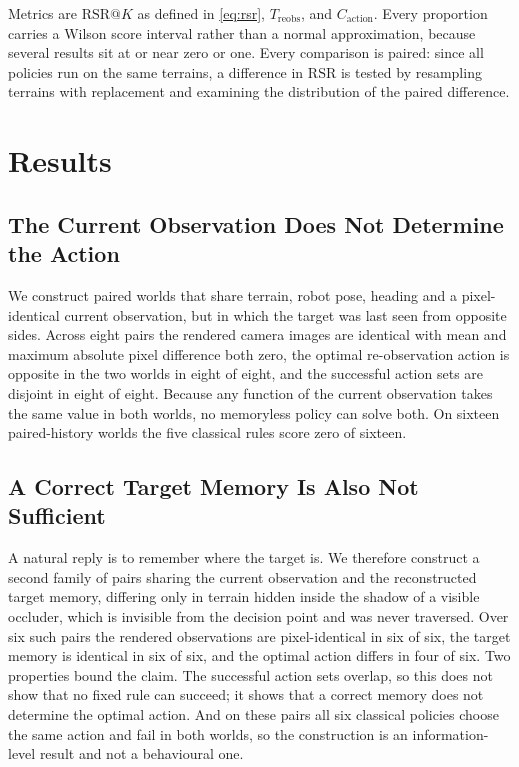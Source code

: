\documentclass[conference]{IEEEtran}
\begin{document}
Metrics are $\mathrm{RSR}@K$ as defined in \eqref{eq:rsr}, $T_{\mathrm{reobs}}$, and
$C_{\mathrm{action}}$. Every proportion carries a Wilson score interval rather than a
normal approximation, because several results sit at or near zero or one. Every
comparison is paired: since all policies run on the same terrains, a difference in
$\mathrm{RSR}$ is tested by resampling terrains with replacement and examining the
distribution of the paired difference.

\section{Results}

\subsection{The Current Observation Does Not Determine the Action}

We construct paired worlds that share terrain, robot pose, heading and a
pixel-identical current observation, but in which the target was last seen from
opposite sides. Across eight pairs the rendered camera images are identical with mean
and maximum absolute pixel difference both zero, the optimal re-observation action is
opposite in the two worlds in eight of eight, and the successful action sets are
disjoint in eight of eight. Because any function of the current observation takes the
same value in both worlds, no memoryless policy can solve both. On sixteen
paired-history worlds the five classical rules score zero of sixteen.

\subsection{A Correct Target Memory Is Also Not Sufficient}

A natural reply is to remember where the target is. We therefore construct a second
family of pairs sharing the current observation and the reconstructed target memory,
differing only in terrain hidden inside the shadow of a visible occluder, which is
invisible from the decision point and was never traversed. Over six such pairs the
rendered observations are pixel-identical in six of six, the target memory is
identical in six of six, and the optimal action differs in four of six. Two properties
bound the claim. The successful action sets overlap, so this does not show that no
fixed rule can succeed; it shows that a correct memory does not determine the optimal
action. And on these pairs all six classical policies choose the same action and fail
in both worlds, so the construction is an information-level result and not a
behavioural one.
\end{document}
